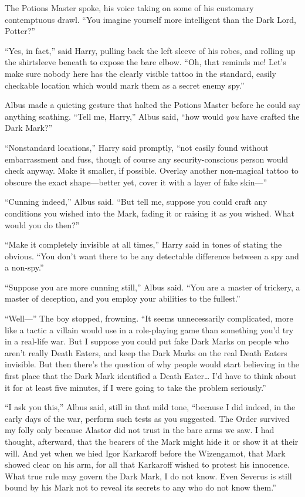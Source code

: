 The Potions Master spoke, his voice taking on some of his customary
contemptuous drawl. ``You imagine yourself more intelligent than the
Dark Lord, Potter?''

``Yes, in fact,'' said Harry, pulling back the left sleeve of his robes,
and rolling up the shirtsleeve beneath to expose the bare elbow. ``Oh,
that reminds me! Let's make sure nobody here has the clearly visible
tattoo in the standard, easily checkable location which would mark them
as a secret enemy spy.''

Albus made a quieting gesture that halted the Potions Master before he
could say anything scathing. ``Tell me, Harry,'' Albus said, ``how would
\emph{you} have crafted the Dark Mark?''

``Nonstandard locations,'' Harry said promptly, ``not easily found
without embarrassment and fuss, though of course any security-conscious
person would check anyway. Make it smaller, if possible. Overlay another
non-magical tattoo to obscure the exact shape---better yet, cover it
with a layer of fake skin---''

``Cunning indeed,'' Albus said. ``But tell me, suppose you could craft
any conditions you wished into the Mark, fading it or raising it as you
wished. What would you do then?''

``Make it completely invisible at all times,'' Harry said in tones of
stating the obvious. ``You don't want there to be any detectable
difference between a spy and a non-spy.''

``Suppose you are more cunning still,'' Albus said. ``You are a master
of trickery, a master of deception, and you employ your abilities to the
fullest.''

``Well---'' The boy stopped, frowning. ``It seems unnecessarily
complicated, more like a tactic a villain would use in a role-playing
game than something you'd try in a real-life war. But I suppose you
could put fake Dark Marks on people who aren't really Death Eaters, and
keep the Dark Marks on the real Death Eaters invisible. But then there's
the question of why people would start believing in the first place that
the Dark Mark identified a Death Eater\ldots{} I'd have to think about
it for at least five minutes, if I were going to take the problem
seriously.''

``I ask you this,'' Albus said, still in that mild tone, ``because I did
indeed, in the early days of the war, perform such tests as you
suggested. The Order survived my folly only because Alastor did not
trust in the bare arms we saw. I had thought, afterward, that the
bearers of the Mark might hide it or show it at their will. And yet when
we hied Igor Karkaroff before the Wizengamot, that Mark showed clear on
his arm, for all that Karkaroff wished to protest his innocence. What
true rule may govern the Dark Mark, I do not know. Even Severus is still
bound by his Mark not to reveal its secrets to any who do not know
them.''

